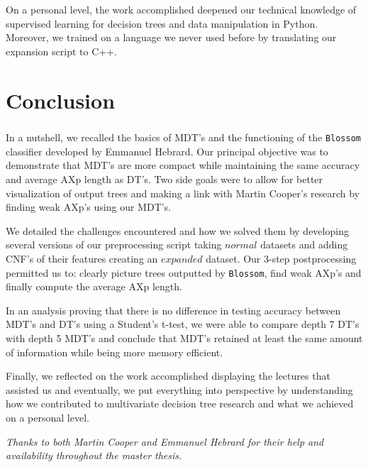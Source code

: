 \documentclass[12pt]{report}
\theoremstyle{definition}
\theoremstyle{definition}
\theoremstyle{definition}
\begin{document}
On a personal level, the work accomplished deepened our technical knowledge of supervised learning for decision trees and data manipulation in Python. Moreover, we trained on a language we never used before by translating our expansion script to C++.



\chapter*{Conclusion}
\paragraph{} In a nutshell, we recalled the basics of MDT's and the functioning of the \texttt{Blossom} classifier developed by Emmanuel Hebrard. Our principal objective was to demonstrate that MDT's are more compact while maintaining the same accuracy and average AXp length as DT's. Two side goals were to allow for better visualization of output trees and making a link with Martin Cooper's research by finding weak AXp's using our MDT's.

We detailed the challenges encountered and how we solved them by developing several versions of our preprocessing script taking $normal$ datasets and adding CNF's of their features creating an $expanded$ dataset. Our 3-step postprocessing permitted us to: clearly picture trees outputted by \texttt{Blossom}, find weak AXp's and finally compute the average AXp length.

In an analysis proving that there is no difference in testing accuracy between MDT's and DT's using a Student's t-test, we were able to compare depth 7 DT's with depth 5 MDT's and conclude that MDT's retained at least the same amount of information while being more memory efficient.

Finally, we reflected on the work accomplished displaying the lectures that assisted us and eventually, we put everything into perspective by understanding how we contributed to multivariate decision tree research and what we achieved on a personal level.

\vspace{9.5cm}

\textit{Thanks to both Martin Cooper and Emmanuel Hebrard for their help and availability throughout the master thesis.}



\nocite{*}


\end{document}
